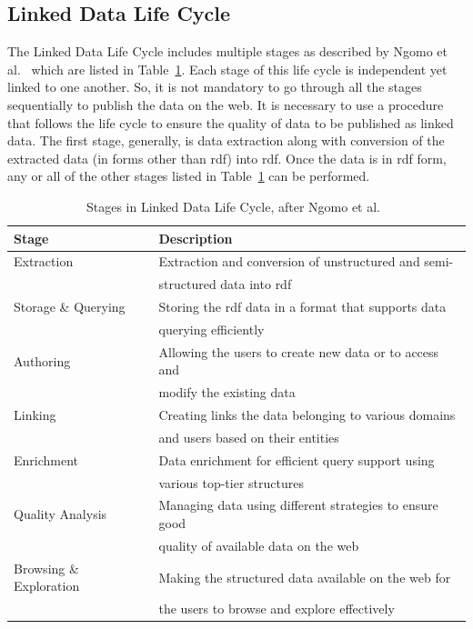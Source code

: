 \begin{doublespace}
\section{Linked Data Life Cycle}
\par The Linked Data Life Cycle includes multiple stages as described by Ngomo et al.~\cite{ngomo2014introduction} which are listed in Table~\ref{table:2.4}. Each stage of this life cycle is independent yet linked to one another. So, it is not mandatory to go through all the stages sequentially to publish the data on the web. It is necessary to use a procedure that follows the life cycle to ensure the quality of data to be published as linked data. The first stage, generally, is data extraction along with conversion of the extracted data (in forms other than \ac{rdf}) into \ac{rdf}. Once the data is in \ac{rdf} form, any or all of the other stages listed in Table~\ref{table:2.4} can be performed.
\begin{table}[h!]
    \centering
    \begin{tabular}{|l|l|} 
    \hline Stage \ & Description \\ \hline
     Extraction & Extraction and conversion of unstructured and semi-\\ & structured data into \ac{rdf}\\ \hline
     Storage \& Querying & Storing the \ac{rdf} data in a format that supports data\\ & querying efficiently\\ \hline
     Authoring & Allowing the users to create new data or to access and\\ & modify the existing data\\ \hline
     Linking & Creating links the data belonging to various domains\\ & and users based on their entities\\ \hline
     Enrichment & Data enrichment for efficient query support using\\ & various top-tier structures\\ \hline
     Quality Analysis & Managing data using different strategies to ensure good\\ & quality of available data on the web\\ \hline
     Browsing \& Exploration & Making the structured data available on the web for\\ & the users to browse and explore effectively\\ \hline
    \end{tabular}
    \caption{Stages in Linked Data Life Cycle, after Ngomo et al.~\cite{ngomo2014introduction}}
    \label{table:2.4}
    \end{table}

\end{doublespace}
